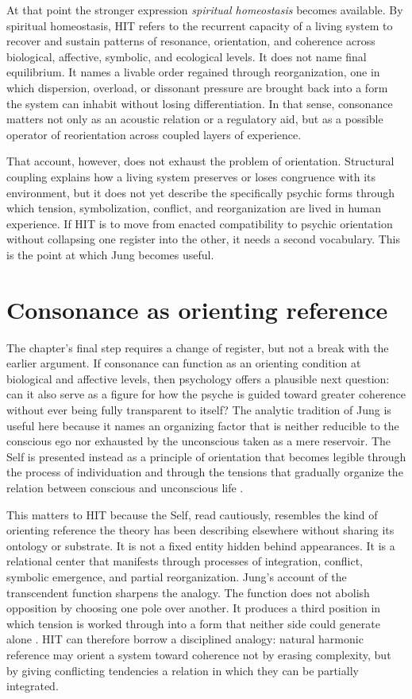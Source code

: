 At that point the stronger expression \emph{spiritual homeostasis} becomes available. By spiritual homeostasis, HIT refers to the recurrent capacity of a living system to recover and sustain patterns of resonance, orientation, and coherence across biological, affective, symbolic, and ecological levels. It does not name final equilibrium. It names a livable order regained through reorganization, one in which dispersion, overload, or dissonant pressure are brought back into a form the system can inhabit without losing differentiation. In that sense, consonance matters not only as an acoustic relation or a regulatory aid, but as a possible operator of reorientation across coupled layers of experience.

That account, however, does not exhaust the problem of orientation. Structural coupling explains how a living system preserves or loses congruence with its environment, but it does not yet describe the specifically psychic forms through which tension, symbolization, conflict, and reorganization are lived in human experience. If HIT is to move from enacted compatibility to psychic orientation without collapsing one register into the other, it needs a second vocabulary. This is the point at which Jung becomes useful.

\section{Consonance as orienting reference}

The chapter's final step requires a change of register, but not a break with the earlier argument. If consonance can function as an orienting condition at biological and affective levels, then psychology offers a plausible next question: can it also serve as a figure for how the psyche is guided toward greater coherence without ever being fully transparent to itself? The analytic tradition of Jung is useful here because it names an organizing factor that is neither reducible to the conscious ego nor exhausted by the unconscious taken as a mere reservoir. The Self is presented instead as a principle of orientation that becomes legible through the process of individuation and through the tensions that gradually organize the relation between conscious and unconscious life \parencite{jung_1959, vonfranz_1964}.

This matters to HIT because the Self, read cautiously, resembles the kind of orienting reference the theory has been describing elsewhere without sharing its ontology or substrate. It is not a fixed entity hidden behind appearances. It is a relational center that manifests through processes of integration, conflict, symbolic emergence, and partial reorganization. Jung's account of the transcendent function sharpens the analogy. The function does not abolish opposition by choosing one pole over another. It produces a third position in which tension is worked through into a form that neither side could generate alone \parencite{jung_1916}. HIT can therefore borrow a disciplined analogy: natural harmonic reference may orient a system toward coherence not by erasing complexity, but by giving conflicting tendencies a relation in which they can be partially integrated.

